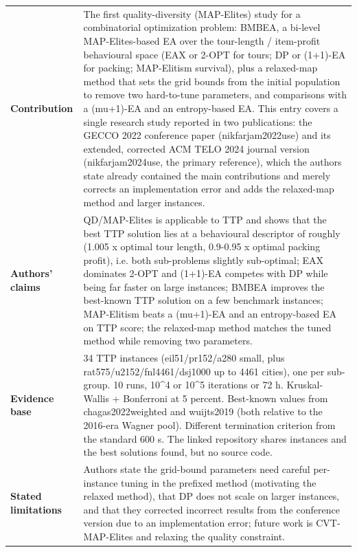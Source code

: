 \documentclass[
  a4paper,
  11pt,
  headings=small,
  numbers=noenddot,
  abstract=on,
  parskip=half,
]{scrartcl}
\begin{document}
\begin{landscape}
\begin{longtable}{@{}p{2.6cm}p{8.7cm}p{2.6cm}p{8.7cm}@{}}
\textbf{Contribution} & \multicolumn{3}{p{20.0cm}}{The first quality-diversity (MAP-Elites) study for a combinatorial optimization problem: BMBEA, a bi-level MAP-Elites-based EA over the tour-length / item-profit behavioural space (EAX or 2-OPT for tours; DP or (1+1)-EA for packing; MAP-Elitism survival), plus a relaxed-map method that sets the grid bounds from the initial population to remove two hard-to-tune parameters, and comparisons with a (mu+1)-EA and an entropy-based EA. This entry covers a single research study reported in two publications: the GECCO 2022 conference paper (nikfarjam2022use) and its extended, corrected ACM TELO 2024 journal version (nikfarjam2024use, the primary reference), which the authors state already contained the main contributions and merely corrects an implementation error and adds the relaxed-map method and larger instances.} \\
\textbf{Authors' claims} & \multicolumn{3}{p{20.0cm}}{QD/MAP-Elites is applicable to TTP and shows that the best TTP solution lies at a behavioural descriptor of roughly (1.005 x optimal tour length, 0.9-0.95 x optimal packing profit), i.e. both sub-problems slightly sub-optimal; EAX dominates 2-OPT and (1+1)-EA competes with DP while being far faster on large instances; BMBEA improves the best-known TTP solution on a few benchmark instances; MAP-Elitism beats a (mu+1)-EA and an entropy-based EA on TTP score; the relaxed-map method matches the tuned method while removing two parameters.} \\
\textbf{Evidence base} & \multicolumn{3}{p{20.0cm}}{34 TTP instances (eil51/pr152/a280 small, plus rat575/u2152/fnl4461/dsj1000 up to 4461 cities), one per sub-group. 10 runs, 10\textasciicircum{}4 or 10\textasciicircum{}5 iterations or 72 h. Kruskal-Wallis + Bonferroni at 5 percent. Best-known values from chagas2022weighted and wuijts2019 (both relative to the 2016-era Wagner pool). Different termination criterion from the standard 600 s. The linked repository shares instances and the best solutions found, but no source code.} \\
\textbf{Stated limitations} & \multicolumn{3}{p{20.0cm}}{Authors state the grid-bound parameters need careful per-instance tuning in the prefixed method (motivating the relaxed method), that DP does not scale on larger instances, and that they corrected incorrect results from the conference version due to an implementation error; future work is CVT-MAP-Elites and relaxing the quality constraint.} \\

\end{longtable}
\end{landscape}
\end{document}
